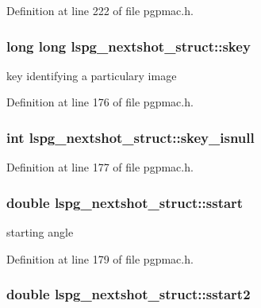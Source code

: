 Definition at line 222 of file pgpmac.h.\hypertarget{structlspg__nextshot__struct_af64a4e3f17752b5f1f05fb15d6f48382}{
\subsubsection[{skey}]{\setlength{\rightskip}{0pt plus 5cm}long long {\bf lspg\_\-nextshot\_\-struct::skey}}}
\label{structlspg__nextshot__struct_af64a4e3f17752b5f1f05fb15d6f48382}


key identifying a particulary image 

Definition at line 176 of file pgpmac.h.\hypertarget{structlspg__nextshot__struct_abd3c69357470052eb79ddd8eddd57b2c}{
\subsubsection[{skey\_\-isnull}]{\setlength{\rightskip}{0pt plus 5cm}int {\bf lspg\_\-nextshot\_\-struct::skey\_\-isnull}}}
\label{structlspg__nextshot__struct_abd3c69357470052eb79ddd8eddd57b2c}


Definition at line 177 of file pgpmac.h.\hypertarget{structlspg__nextshot__struct_a8dc11eaa094d59f61642c4abc226918f}{
\subsubsection[{sstart}]{\setlength{\rightskip}{0pt plus 5cm}double {\bf lspg\_\-nextshot\_\-struct::sstart}}}
\label{structlspg__nextshot__struct_a8dc11eaa094d59f61642c4abc226918f}


starting angle 

Definition at line 179 of file pgpmac.h.\hypertarget{structlspg__nextshot__struct_a8445cbd2206dc6d62b6bd433f5218c98}{
\subsubsection[{sstart2}]{\setlength{\rightskip}{0pt plus 5cm}double {\bf lspg\_\-nextshot\_\-struct::sstart2}}}
\label{structlspg__nextshot__struct_a8445cbd2206dc6d62b6bd433f5218c98}


